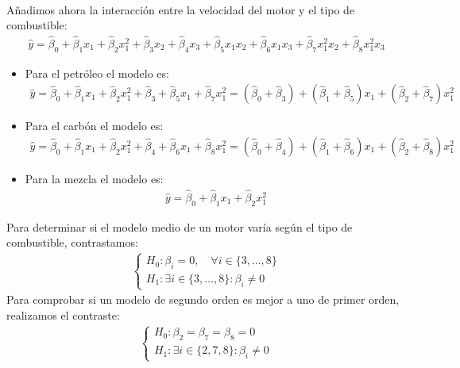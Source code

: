 \begin{ejemplo}
\begin{itemize}
\begin{align*}
        \end{align*}
\end{itemize}
Añadimos ahora la interacción entre la velocidad del motor y el tipo de combustible:
\begin{align*}
    \widehat{y} = \widehat{\beta}_0 + \widehat{\beta}_1x_1 + \widehat{\beta}_2x_1^2 + \widehat{\beta}_3x_2 + \widehat{\beta}_4x_3 + \widehat{\beta}_5x_1x_2 + \widehat{\beta}_6x_1x_3 + \widehat{\beta}_7x_1^2x_2 + \widehat{\beta}_8x_1^2x_3
\end{align*}
\begin{itemize}
    \item Para el petróleo el modelo es:
        \begin{align*}
            \widehat{y} = \widehat{\beta}_0 + \widehat{\beta}_1x_1 + \widehat{\beta}_2x_1^2 + \widehat{\beta}_3 + \widehat{\beta}_5x_1 + \widehat{\beta}_7x_1^2 = (\widehat{\beta}_0 + \widehat{\beta}_3) + (\widehat{\beta}_1 + \widehat{\beta}_5)x_1 + (\widehat{\beta}_2 + \widehat{\beta}_7)x_1^2
        \end{align*}
    \item Para el carbón el modelo es:
        \begin{align*}
            \widehat{y} = \widehat{\beta}_0 + \widehat{\beta}_1x_1 + \widehat{\beta}_2x_1^2 + \widehat{\beta}_4 + \widehat{\beta}_6x_1 + \widehat{\beta}_8x_1^2 = (\widehat{\beta}_0 + \widehat{\beta}_4) + (\widehat{\beta}_1 + \widehat{\beta}_6)x_1 + (\widehat{\beta}_2 + \widehat{\beta}_8)x_1^2
        \end{align*}
    \item Para la mezcla el modelo es:
        \begin{align*}
            \widehat{y} = \widehat{\beta}_0 + \widehat{\beta}_1x_1 + \widehat{\beta}_2x_1^2
        \end{align*}
\end{itemize}
Para determinar si el modelo medio de un motor varía según el tipo de combustible, contrastamos:
\begin{align*}
    \begin{cases}
            H_0: \beta_i = 0, \quad \forall i \in \{3,\ldots,8\} \\
            H_1 : \exists i \in \{3,\ldots,8\} : \beta_i \not = 0
        \end{cases}
\end{align*}
Para comprobar si un modelo de segundo orden es mejor a uno de primer orden, realizamos el contraste:
\begin{align*}
    \begin{cases}
            H_0: \beta_2 = \beta_7 = \beta_8 = 0 \\
            H_1: \exists i \in \{2,7,8\} : \beta_i \not = 0
        \end{cases}
\end{align*} 
\end{ejemplo}
